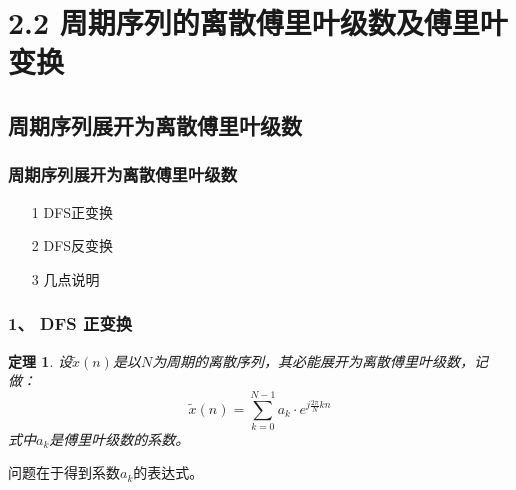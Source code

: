 \documentclass[notheorems,compress,mathserif,table]{beamer}
\newtheorem{theorem}{定理}
\begin{document}
\section{2.2 周期序列的离散傅里叶级数及傅里叶变换}
\subsection*{周期序列展开为离散傅里叶级数}

\begin{frame}[shrink]\frametitle{周期序列展开为离散傅里叶级数}%


\begin{enumerate}
\item [1] DFS正变换
\item [2] DFS反变换
\item [3] 几点说明
\end{enumerate}


\end{frame}



\begin{frame}[shrink]\frametitle{1、 DFS 正变换}%
\begin{theorem}
设$\tilde{x}(n)$是以$N$为周期的离散序列，其必能展开为离散傅里叶级数，记做：
\begin{equation*}%
\tilde{x}(n) = \sum_{k=0}^{N-1}a_{k}\cdot e^{j\frac{2\pi}{N}kn}
\end{equation*}
式中$a_{k}$是傅里叶级数的系数。
\end{theorem}



\par 问题在于得到系数$a_{k}$的表达式。

\end{frame}
\end{document}
